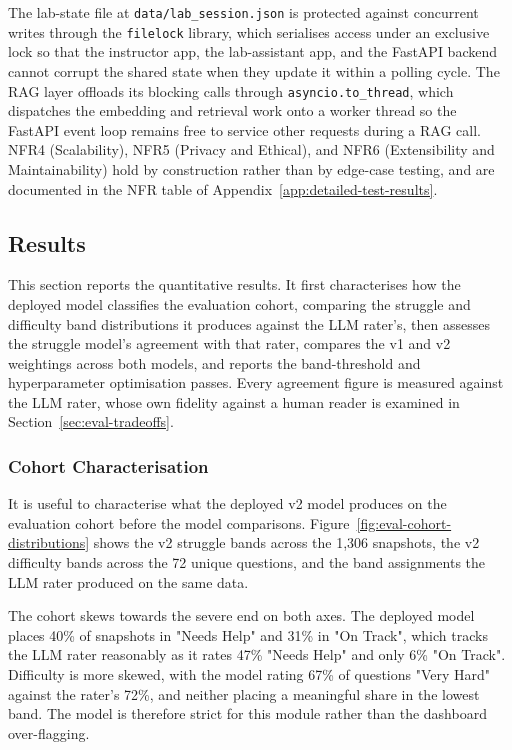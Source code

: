 The lab-state file at \texttt{data/lab\_session.json} is protected against concurrent writes through the \texttt{filelock} library, which serialises access under an exclusive lock so that the instructor app, the lab-assistant app, and the FastAPI backend cannot corrupt the shared state when they update it within a polling cycle.
The RAG layer offloads its blocking calls through \texttt{asyncio.to\_thread}, which dispatches the embedding and retrieval work onto a worker thread so the FastAPI event loop remains free to service other requests during a RAG call.
NFR4 (Scalability), NFR5 (Privacy and Ethical), and NFR6 (Extensibility and Maintainability) hold by construction rather than by edge-case testing, and are documented in the NFR table of Appendix~\ref{app:detailed-test-results}.

\subsection{Results} \label{sec:eval-results}

This section reports the quantitative results. It first characterises how the deployed model classifies the evaluation cohort, comparing the struggle and difficulty band distributions it produces against the LLM rater's, then assesses the struggle model's agreement with that rater, compares the v1 and v2 weightings across both models, and reports the band-threshold and hyperparameter optimisation passes. Every agreement figure is measured against the LLM rater, whose own fidelity against a human reader is examined in Section~\ref{sec:eval-tradeoffs}.


\subsubsection{Cohort Characterisation}

It is useful to characterise what the deployed v2 model produces on the evaluation cohort before the model comparisons.
Figure~\ref{fig:eval-cohort-distributions} shows the v2 struggle bands across the 1{,}306 snapshots, the v2 difficulty bands across the 72 unique questions, and the band assignments the LLM rater produced on the same data.

The cohort skews towards the severe end on both axes.
The deployed model places 40\% of snapshots in "Needs Help" and 31\% in "On Track", which tracks the LLM rater reasonably as it rates 47\% "Needs Help" and only 6\% "On Track".
Difficulty is more skewed, with the model rating 67\% of questions "Very Hard" against the rater's 72\%, and neither placing a meaningful share in the lowest band.
The model is therefore strict for this module rather than the dashboard over-flagging.

